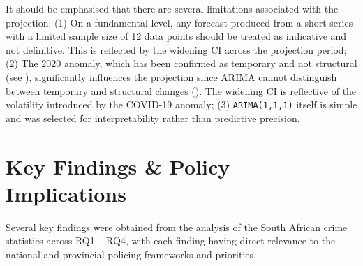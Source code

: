 \documentclass[titlepage, 12pt, oneside]{article}
\numberwithin{equation}{section}
\begin{document}
    It should be emphasised that there are several limitations associated with the projection: (1) On a fundamental level, any forecast produced from a short series with a limited sample size of 12 data points should be treated as indicative and not definitive. This is reflected by the widening CI across the projection period; (2) The 2020 anomaly, which has been confirmed as temporary and not structural (see ), significantly influences the projection since ARIMA cannot distinguish between temporary and structural changes (\cite{box2015}). The widening CI is reflective of the volatility introduced by the COVID-19 anomaly; (3) \texttt{ARIMA(1,1,1)} itself is simple and was selected for interpretability rather than predictive precision. 
	\newpage
	\section{Key Findings \& Policy Implications}
	Several key findings were obtained from the analysis of the South African crime statistics across RQ1 -- RQ4, with each finding having direct relevance to the national and provincial policing frameworks and priorities. 
	
\end{document}
